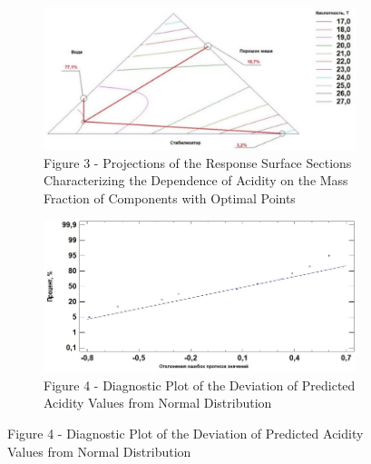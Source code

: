 \begin{figure}[H]
    \centering
    \begin{subfigure}[t]{0.44\textwidth} %
        \centering
        \includegraphics[width=\textwidth]{media/pish/image7}
        \caption*{Figure 3 - Projections of the Response Surface Sections
Characterizing the Dependence of Acidity on the Mass Fraction of
Components with Optimal Points}
    \end{subfigure}
    \hspace{0.05\textwidth} %
    \begin{subfigure}[t]{0.44\textwidth} %
        \centering
        \includegraphics[width=\textwidth]{media/pish/image8}
        \caption*{Figure 4 - Diagnostic Plot of the Deviation of Predicted Acidity
Values from Normal Distribution}
    \end{subfigure}
\end{figure}

